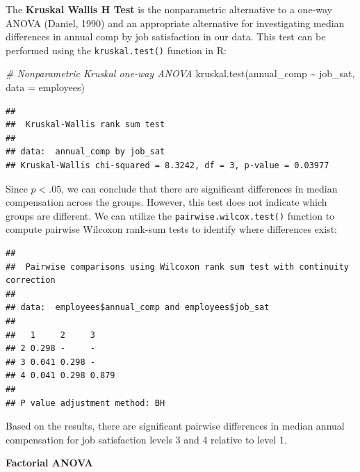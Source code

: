 \documentclass[
]{book}
\newenvironment{Shaded}{\begin{snugshade}}{\end{snugshade}}
\newcommand{\AttributeTok}[1]{\textcolor[rgb]{0.77,0.63,0.00}{#1}}
\newcommand{\CommentTok}[1]{\textcolor[rgb]{0.56,0.35,0.01}{\textit{#1}}}
\newcommand{\FunctionTok}[1]{\textcolor[rgb]{0.00,0.00,0.00}{#1}}
\newcommand{\NormalTok}[1]{#1}
\newcommand{\SpecialCharTok}[1]{\textcolor[rgb]{0.00,0.00,0.00}{#1}}
\newcommand{\StringTok}[1]{\textcolor[rgb]{0.31,0.60,0.02}{#1}}
\begin{document}
The \textbf{Kruskal Wallis H Test} is the nonparametric alternative to a one-way ANOVA (Daniel, 1990) and an appropriate alternative for investigating median differences in annual comp by job satisfaction in our data. This test can be performed using the \texttt{kruskal.test()} function in R:

\begin{Shaded}
\begin{Highlighting}[]
\CommentTok{\# Nonparametric Kruskal one{-}way ANOVA}
\FunctionTok{kruskal.test}\NormalTok{(annual\_comp }\SpecialCharTok{\textasciitilde{}}\NormalTok{ job\_sat, }\AttributeTok{data =}\NormalTok{ employees)}
\end{Highlighting}
\end{Shaded}

\begin{verbatim}
## 
##  Kruskal-Wallis rank sum test
## 
## data:  annual_comp by job_sat
## Kruskal-Wallis chi-squared = 8.3242, df = 3, p-value = 0.03977
\end{verbatim}

Since \(p < .05\), we can conclude that there are significant differences in median compensation across the groups. However, this test does not indicate which groups are different. We can utilize the \texttt{pairwise.wilcox.test()} function to compute pairwise Wilcoxon rank-sum tests to identify where differences exist:

\begin{Shaded}
\end{Shaded}

\begin{verbatim}
## 
##  Pairwise comparisons using Wilcoxon rank sum test with continuity correction 
## 
## data:  employees$annual_comp and employees$job_sat 
## 
##   1     2     3    
## 2 0.298 -     -    
## 3 0.041 0.298 -    
## 4 0.041 0.298 0.879
## 
## P value adjustment method: BH
\end{verbatim}

Based on the results, there are significant pairwise differences in median annual compensation for job satisfaction levels 3 and 4 relative to level 1.

\textbf{Factorial ANOVA}
\end{document}

